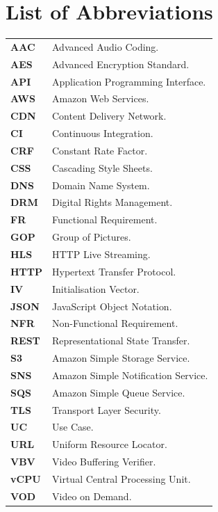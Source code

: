 \chapter*{List of Abbreviations}

\begin{longtable}{p{} p{}}
\textbf{AAC}    & Advanced Audio Coding. \\
\textbf{AES}    & Advanced Encryption Standard. \\
\textbf{API}    & Application Programming Interface. \\
\textbf{AWS}    & Amazon Web Services. \\
\textbf{CDN}    & Content Delivery Network. \\
\textbf{CI}     & Continuous Integration. \\
\textbf{CRF}    & Constant Rate Factor. \\
\textbf{CSS}    & Cascading Style Sheets. \\
\textbf{DNS}    & Domain Name System. \\
\textbf{DRM}    & Digital Rights Management. \\
\textbf{FR}     & Functional Requirement. \\
\textbf{GOP}    & Group of Pictures. \\
\textbf{HLS}    & HTTP Live Streaming. \\
\textbf{HTTP}   & Hypertext Transfer Protocol. \\
\textbf{IV}     & Initialisation Vector. \\
\textbf{JSON}   & JavaScript Object Notation. \\
\textbf{NFR}    & Non-Functional Requirement. \\
\textbf{REST}   & Representational State Transfer. \\
\textbf{S3}     & Amazon Simple Storage Service. \\
\textbf{SNS}    & Amazon Simple Notification Service. \\
\textbf{SQS}    & Amazon Simple Queue Service. \\
\textbf{TLS}    & Transport Layer Security. \\
\textbf{UC}     & Use Case. \\
\textbf{URL}    & Uniform Resource Locator. \\
\textbf{VBV}    & Video Buffering Verifier. \\
\textbf{vCPU}   & Virtual Central Processing Unit. \\
\textbf{VOD}    & Video on Demand. \\
\end{longtable}
